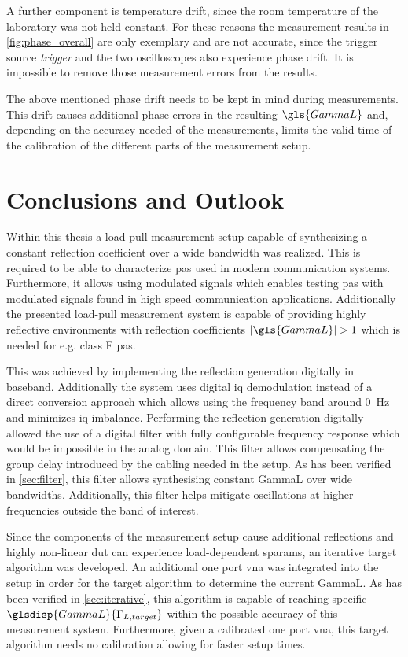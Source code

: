 \documentclass[12pt,a4paper,parskip=full,abstract=true,BCOR=12mm,twoside,open=right]{scrreprt}
\providecommand{\abs}[1]{\lvert#1\rvert}
\def\device#1{\mbox{\textit{#1}}}
\begin{document}
A further component is temperature drift, since the room temperature
of the laboratory was not held constant. For these reasons the measurement results in
\cref{fig:phase_overall} are only exemplary and are not accurate, since the trigger
source \device{trigger} and the two oscilloscopes also experience phase drift. It is
impossible to remove those measurement errors from the results.

The above mentioned phase drift needs to be kept in mind during measurements. This
drift causes additional phase errors in the resulting $\gls{GammaL}$ and, depending on
the accuracy needed of the measurements, limits the valid time of the calibration of
the different parts of the measurement setup.


\chapter{Conclusions and Outlook}

Within this thesis a load-pull measurement setup capable of synthesizing
a constant reflection coefficient over a wide bandwidth was realized. This
is required to be able to characterize \glspl{pa} used in modern
communication systems. Furthermore, it allows using modulated signals which
enables testing \glspl{pa} with modulated signals found in high speed
communication applications. Additionally the presented load-pull measurement
system is capable of providing highly reflective environments with
reflection coefficients $\abs{\gls{GammaL}} > 1$ which is needed for
e.g. class F \glspl{pa}.

This was achieved by implementing the reflection generation digitally in
baseband. Additionally the system uses digital \gls{iq} demodulation
instead of a direct conversion approach which allows using the
frequency band around \SI{0}{\hertz} and minimizes \gls{iq} imbalance.
Performing the reflection generation digitally allowed the use of a
digital filter with fully configurable frequency response which would
be impossible in the analog domain. This filter allows compensating
the group delay introduced by the cabling needed in the setup. As has been
verified in \cref{sec:filter}, this filter allows synthesising constant
\gls{GammaL} over wide bandwidths. Additionally, this filter helps mitigate
oscillations at higher frequencies outside the band of interest.

Since the components of the measurement setup cause additional reflections
and highly non-linear \gls{dut} can experience load-dependent \glspl{sparam},
an iterative target algorithm was developed. An additional one port \gls{vna}
was integrated into the setup in order for the target algorithm to determine
the current \gls{GammaL}. As has been verified in \cref{sec:iterative}, this
algorithm is capable of reaching specific $\glsdisp{GammaL}{\Gamma_{L,target}}$
within the possible accuracy of this measurement system. Furthermore, given
a calibrated one port \gls{vna}, this target algorithm needs no calibration
allowing for faster setup times.
\end{document}
